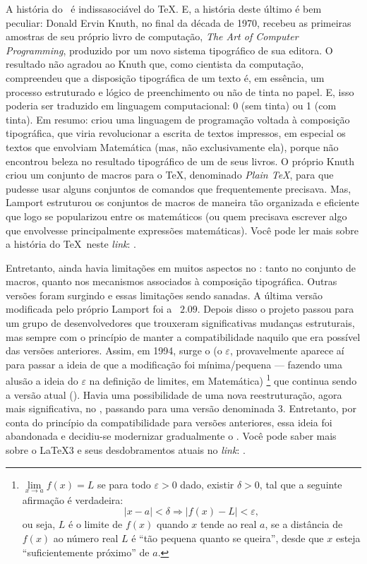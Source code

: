 A história do \latex\ é indissasociável do \TeX. 
E, a história deste último é bem peculiar: \textsf{Donald Ervin Knuth}, no final 
da década de 1970, recebeu as primeiras amostras de seu próprio livro de 
computação, \textit{The Art of Computer Programming}, produzido por um novo 
sistema tipográfico de sua editora. 
O resultado não agradou ao Knuth que, como cientista da computação, compreendeu 
que a disposição tipográfica de um texto é, em essência, um processo estruturado 
e lógico de preenchimento ou não de tinta no papel. 
E, isso poderia ser traduzido em linguagem computacional: 0 (sem tinta) ou 1 (com tinta). 
Em resumo: criou uma linguagem de programação voltada à composição tipográfica, 
que viria revolucionar a escrita de textos impressos, em especial os textos que 
envolviam Matemática (mas, não exclusivamente ela), porque não encontrou beleza 
no resultado tipográfico de um de seus livros. 
O próprio Knuth criou um conjunto de macros para o \TeX, denominado \textit{Plain \TeX}, 
para que pudesse usar alguns conjuntos de comandos que frequentemente precisava. 
Mas, Lamport estruturou os conjuntos de macros de maneira tão organizada e eficiente 
que logo se popularizou entre os matemáticos (ou quem precisava escrever algo que 
envolvesse principalmente expressões matemáticas). 
Você pode ler mais sobre a história do \TeX\ neste \textit{link}: 
. 

Entretanto, ainda havia limitações em muitos aspectos no \latex: tanto no 
conjunto de macros, quanto nos mecanismos associados à composição tipográfica. 
Outras versões foram surgindo e essas limitações sendo sanadas. 
A última versão modificada pelo próprio Lamport foi a ~$2.09$. 
Depois disso o projeto passou para um grupo de desenvolvedores que trouxeram 
significativas mudanças estruturais, mas sempre com o princípio de manter a 
compatibilidade naquilo que era possível das versões anteriores. 
Assim, em 1994, surge o  (o $\varepsilon$, provavelmente aparece aí 
para passar a ideia de que a modificação foi mínima/pequena --- fazendo uma 
alusão a ideia do $\varepsilon$ na definição de limites, em Matemática)
\footnote{ 
  $ \lim\limits_{x \to a} f(x) = L$ se para todo $ \varepsilon > 0 $ dado, existir 
  $ \delta > 0 $, tal que a seguinte afirmação é verdadeira:
  \[
    \vert x - a \vert < \delta \Rightarrow \vert f(x) - L \vert < \varepsilon,
  \]
  ou seja, $L$ é o \textsf{limite} de $f(x)$ quando $x$ tende ao real $a$, se a 
  distância de $ f(x) $ ao número real $ L $ é ``tão pequena quanto se queira'', 
  desde que $ x $ esteja ``suficientemente próximo'' de $a$.
} que continua sendo a versão atual (\the\year). 
Havia uma possibilidade de uma nova reestruturação, agora mais significativa, no 
, passando para uma versão denominada \latex$3$. 
Entretanto, por conta do princípio da compatibilidade para versões anteriores, 
essa ideia foi abandonada e decidiu-se modernizar gradualmente o . 
Você pode saber mais sobre o \LaTeX 3 e seus desdobramentos atuais no \textit{link}:
.


